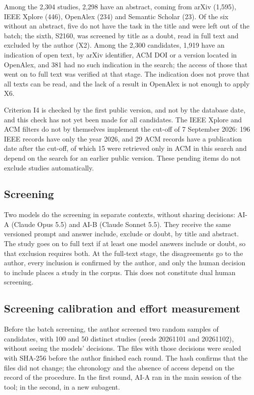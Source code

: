 Among the 2,304 studies, 2,298 have an abstract, coming from arXiv (1,595), IEEE Xplore (446), OpenAlex
(234) and Semantic Scholar (23). Of the six without an abstract, five do not have the task in the title and were left
out of the batch; the sixth, S2160, was screened by title as a doubt, read in full text and excluded by the author (X2). Among the 2,300 candidates, 1,919 have an indication of open text, by
arXiv identifier, ACM DOI or a version located in OpenAlex, and 381 had no such indication
in the search; the access of those that went on to full text was verified at that stage.
The indication does not prove that all texts can be read, and the lack of a result in OpenAlex is not
enough to apply X6.

Criterion I4 is checked by the first public version, and not by the database date, and this check
has not yet been made for all candidates. The IEEE Xplore and ACM filters do not by themselves implement
the cut-off of 7 September 2026: 196 IEEE records have only the year 2026, and 29 ACM records have a publication
date after the cut-off, of which 15 were retrieved only in ACM in this search and depend on the search for
an earlier public version. These pending items do not exclude studies automatically.

\subsection{Screening}
Two models do the screening in separate contexts, without sharing decisions: AI-A (Claude Opus 5.5)
and AI-B (Claude Sonnet 5.5). They receive the same versioned prompt and answer include, exclude or
doubt, by title and abstract. The study goes on to full text if at least one model answers
include or doubt, so that exclusion requires both. At the full-text stage, the disagreements go to the
author, every inclusion is confirmed by the author, and only the human decision to include places a study in the
corpus. This does not constitute dual human screening.

\subsection{Screening calibration and effort measurement}\label{sec:calibracao}
Before the batch screening, the author screened two random samples of candidates, with 100 and 50 distinct
studies (seeds 20261101 and 20261102), without seeing the models' decisions. The files with those decisions
were sealed with SHA-256 before the author finished each round. The hash confirms that the files
did not change; the chronology and the absence of access depend on the record of the procedure. In the first
round, AI-A ran in the main session of the tool; in the second, in a new subagent.

